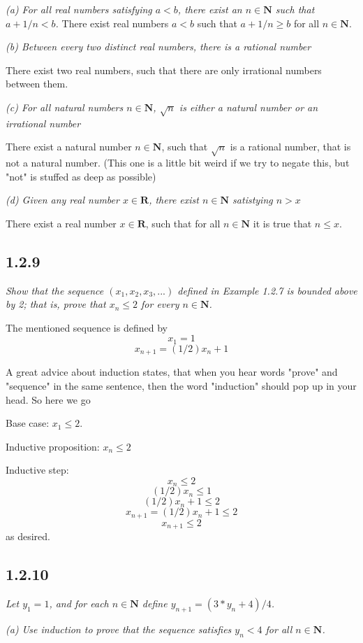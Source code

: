 \documentclass[11pt,oneside,titlepage]{book}
\begin{document}
\textit{(a) For all real numbers satisfying $a < b$, there exist an $n \in
  \textbf{N}$ such that $a + 1/n < b$.}
There exist real numbers $a < b$ such that $a + 1/n \geq b$ for all $n \in \textbf{N}$.

\textit{(b) Between every two distinct real numbers, there is a rational number}

There exist two real numbers, such that there are only irrational numbers
between them.

\textit{(c) For all natural numbers $n \in \textbf{N}$, $\sqrt{n}$ is either a
  natural number  or an irrational number}

There exist a natural number $n \in \textbf{N}$, such that $\sqrt{n}$ is a
rational number, that is not a natural number. (This one is a little bit weird
if we try to negate this, but "not" is stuffed as deep as possible)

\textit{(d) Given any real number $x \in \textbf{R}$, there exist $n \in
  \textbf{N}$ satistying $n > x$}

There exist a real number $x \in \textbf{R}$, such that
for all $n \in \textbf{N}$ it is true that $n \leq x$.

\subsection*{1.2.9}
\textit{Show that the sequence $(x_1, x_2, x_3,...)$ defined in Example 1.2.7
  is bounded above by 2; that is, prove that $x_n \leq 2$ for every $n \in
  \textbf{N}$.}

The mentioned sequence is defined by
$$x_1 = 1$$
$$x_{n + 1} = (1/2)x_n + 1$$

A great advice about induction states, that when you hear words "prove" and
"sequence" in the same sentence, then the word "induction" should pop up in
your head. So here we go

Base case: $x_1 \leq 2$.

Inductive proposition: $x_n \leq 2$

Inductive step:
$$x_n \leq 2$$
$$(1/2)x_n \leq 1$$
$$(1/2)x_n + 1 \leq 2$$
$$x_{n + 1} = (1/2)x_n + 1 \leq 2$$
$$x_{n + 1} \leq 2$$
as desired.

\subsection*{1.2.10}
\textit{Let $y_1 = 1$, and for each $n \in \textbf{N}$ define $y_{n + 1} =
  (3 * y_n + 4) / 4$.}

\textit{(a) Use induction to prove that the sequence satisfies $y_n < 4$ for
  all $n \in \textbf{N}$.}
\end{document}
